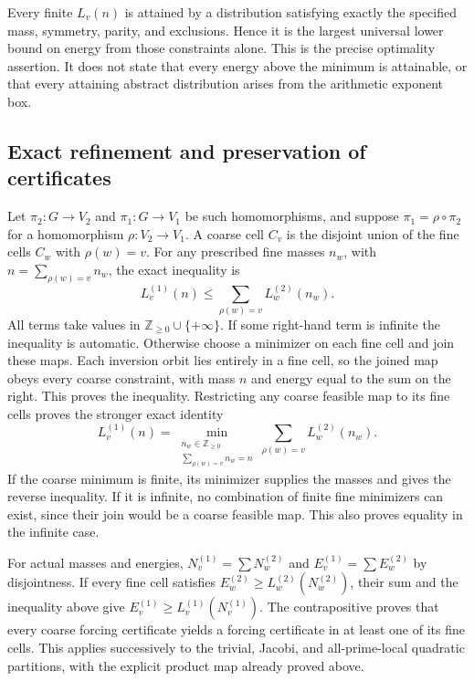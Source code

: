 Every finite $L_v(n)$ is attained by a distribution satisfying exactly
the specified mass, symmetry, parity, and exclusions. Hence it is the
largest universal lower bound on energy from those constraints alone.
This is the precise optimality assertion. It does not state that every
energy above the minimum is attainable, or that every attaining abstract
distribution arises from the arithmetic exponent box.

\subsection{Exact refinement and preservation of certificates}
Let $\pi_2:G\to V_2$ and $\pi_1:G\to V_1$ be such homomorphisms,
and suppose $\pi_1=\rho\circ\pi_2$ for a homomorphism
$\rho:V_2\to V_1$. A coarse cell $C_v$ is the disjoint union of
the fine cells $C_w$ with $\rho(w)=v$. For any prescribed fine
masses $n_w$, with $n=\sum_{\rho(w)=v}n_w$, the exact inequality is
\[
 L^{(1)}_v(n)\leq\sum_{\rho(w)=v} L^{(2)}_w(n_w).
\]
All terms take values in $\mathbb Z_{\geq0}\cup\{+\infty\}$.
If some right-hand term is infinite the inequality is automatic.
Otherwise choose a minimizer on each fine cell and join these maps.
Each inversion orbit lies entirely in a fine cell, so the joined map
obeys every coarse constraint, with mass $n$ and energy equal to the
sum on the right. This proves the inequality. Restricting any coarse
feasible map to its fine cells proves the stronger exact identity
\[
 L^{(1)}_v(n)=
 \min_{\substack{n_w\in\mathbb Z_{\geq0}\\
                  \sum_{\rho(w)=v}n_w=n}}
       \sum_{\rho(w)=v}L^{(2)}_w(n_w).
\]
If the coarse minimum is finite, its minimizer supplies the masses
and gives the reverse inequality. If it is infinite, no combination
of finite fine minimizers can exist, since their join would be a
coarse feasible map. This also proves equality in the infinite case.

For actual masses and energies,
$N^{(1)}_v=\sum N^{(2)}_w$ and $E^{(1)}_v=\sum E^{(2)}_w$ by disjointness.
If every fine cell satisfies $E^{(2)}_w\geq L^{(2)}_w(N^{(2)}_w)$,
their sum and the inequality above give
$E^{(1)}_v\geq L^{(1)}_v(N^{(1)}_v)$. The contrapositive proves that
every coarse forcing certificate yields a forcing certificate in at
least one of its fine cells. This applies successively to the trivial,
Jacobi, and all-prime-local quadratic partitions, with the explicit
product map already proved above.

